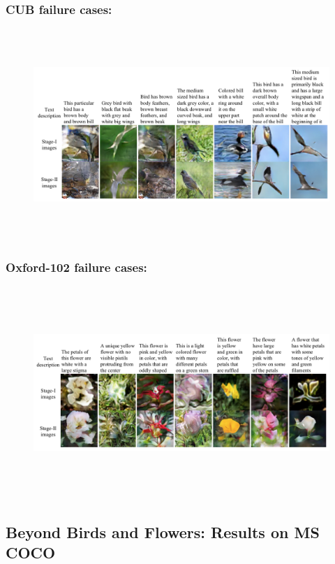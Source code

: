 \documentclass[a4paper,12pt,oneside]{article}
\begin{document}
        \subsubsection{CUB failure cases:}
        \begin{figure}[H]
          \centering
          \includegraphics[height=8cm,width=15cm]{Figure13.png}
          \end{figure}
        \subsubsection{Oxford-102 failure cases:}
        \begin{figure}[H]
          \centering
          \includegraphics[height=8cm,width=15cm]{Figure14.png}
          \end{figure}
\subsection{Beyond Birds and Flowers: Results on MS COCO}
\end{document}
